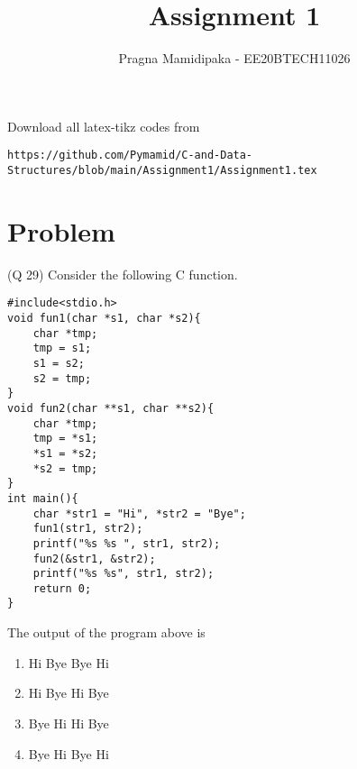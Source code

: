 \documentclass[journal,12pt,twocolumn]{IEEEtran}
\begin{document}
     \def\rightbox#1{\makebox[0in][r]{#1}}
     \def\centbox#1{\makebox[0in]{#1}}
     \def\topbox#1{\raisebox{-\baselineskip}[0in][0in]{#1}}
     \def\midbox#1{\raisebox{-0.5\baselineskip}[0in][0in]{#1}}
\vspace{3cm}
\title{Assignment 1}
\author{Pragna Mamidipaka - EE20BTECH11026}
\maketitle
\newpage
\bigskip
\renewcommand{\thefigure}{\theenumi}
\renewcommand{\thetable}{\theenumi}
Download all latex-tikz codes from 
%
\begin{lstlisting}
https://github.com/Pymamid/C-and-Data-Structures/blob/main/Assignment1/Assignment1.tex
\end{lstlisting}
\section{Problem}
(Q 29) Consider the following C function.
\begin{lstlisting}
#include<stdio.h>
void fun1(char *s1, char *s2){
    char *tmp;
    tmp = s1;
    s1 = s2;
    s2 = tmp;
}
void fun2(char **s1, char **s2){
    char *tmp;
    tmp = *s1;
    *s1 = *s2;
    *s2 = tmp;
}
int main(){
    char *str1 = "Hi", *str2 = "Bye";
    fun1(str1, str2); 
    printf("%s %s ", str1, str2);
    fun2(&str1, &str2); 
    printf("%s %s", str1, str2);
    return 0;
}
\end{lstlisting}
The output of the program above is

\begin{enumerate}
    \item Hi Bye Bye Hi
    \item Hi Bye Hi Bye
    \item Bye Hi Hi Bye
    \item Bye Hi Bye Hi
\end{enumerate}
\end{document}
